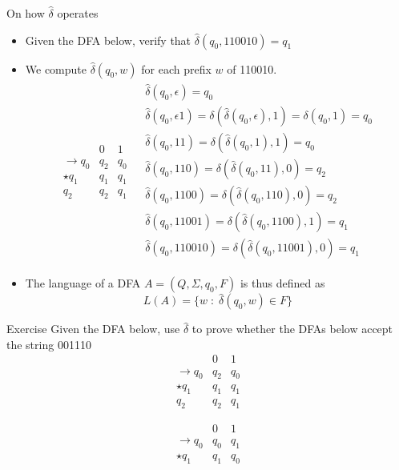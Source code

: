 \documentclass{prosper}%
\begin{document}
\begin{slide}{ On how $\hat\delta$ operates}
\begin{itemize}
\item Given the DFA below, verify that $\hat{\delta}(q_0,110010) = q_1$
\item We compute $\hat\delta(q_0,w)$ for each prefix $w$ of 110010.
\[
\begin{array}{l|l}
\begin{array}{r||l|l}
&0&1\\\hline
\rightarrow q_0&q_2 & q_0\\
\star q_1 & q_1 & q_1\\
q_2& q_2& q_1
\end{array}
&
\begin{array}{l}
\hat{\delta}(q_0, \epsilon) = q_0\\
\hat{\delta}(q_0, \epsilon 1) = \delta(\hat{\delta}(q_0, \epsilon), 1) = \delta(q_0, 1) =q_0\\
\hat{\delta}(q_0, 11) = \delta(\hat{\delta}(q_0, 1), 1) = q_0\\
\hat{\delta}(q_0, 110) = \delta(\hat{\delta}(q_0, 11), 0) = q_2\\
\hat{\delta}(q_0, 1100) = \delta(\hat{\delta}(q_0, 110), 0) = q_2\\
\hat{\delta}(q_0, 11001) = \delta(\hat{\delta}(q_0, 1100), 1) = q_1\\
\hat{\delta}(q_0, 110010) = \delta(\hat{\delta}(q_0, 11001), 0) = q_1
\end{array}
\end{array}
\]
\item The language of a DFA $A=(Q, \Sigma, q_0, F)$ is thus defined as
\[
L(A) = \{w\; :\; \hat{\delta}(q_0, w) \in F\}
\]
\end{itemize}
\end{slide}

\begin{slide}{Exercise}
Given the DFA below, use $\hat\delta$ to prove whether the DFAs below accept the string 001110
\[
\begin{array}{r||l|l}
&0&1\\\hline
\rightarrow q_0&q_2 & q_0\\
\star q_1 & q_1 & q_1\\
q_2& q_2& q_1
\end{array}
\]

\[
\begin{array}{r||l|l}
&0&1\\\hline
\rightarrow q_0&q_0 & q_1\\
\star q_1 & q_1 & q_0\\
\end{array}
\]
\end{slide}
\end{document}
